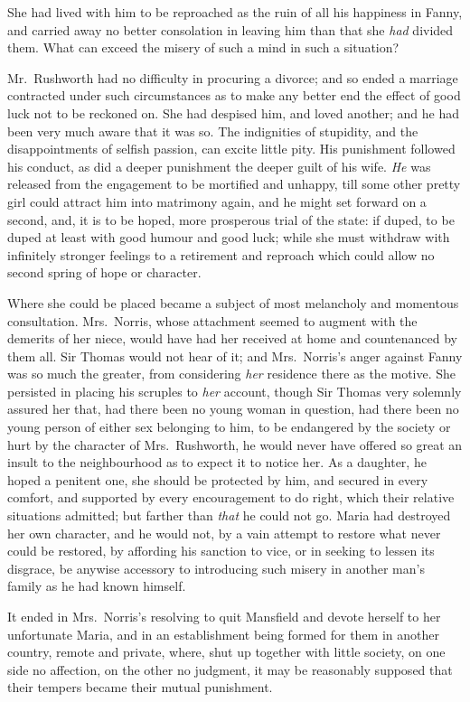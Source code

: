 \documentclass{article}
\begin{document}
She had lived with him to be reproached as the ruin
of all his happiness in Fanny, and carried away no better
consolation in leaving him than that she \emph{had} divided them.
What can exceed the misery of such a mind in such a situation?

Mr.\ Rushworth had no difficulty in procuring a divorce;
and so ended a marriage contracted under such circumstances
as to make any better end the effect of good luck not to
be reckoned on.  She had despised him, and loved another;
and he had been very much aware that it was so.
The indignities of stupidity, and the disappointments
of selfish passion, can excite little pity.  His punishment
followed his conduct, as did a deeper punishment the
deeper guilt of his wife.  \emph{He} was released from the
engagement to be mortified and unhappy, till some other
pretty girl could attract him into matrimony again,
and he might set forward on a second, and, it is to
be hoped, more prosperous trial of the state:  if duped,
to be duped at least with good humour and good luck;
while she must withdraw with infinitely stronger feelings
to a retirement and reproach which could allow no second
spring of hope or character.

Where she could be placed became a subject of most
melancholy and momentous consultation.  Mrs.\ Norris,
whose attachment seemed to augment with the demerits
of her niece, would have had her received at home and
countenanced by them all.  Sir Thomas would not hear of it;
and Mrs.\ Norris's anger against Fanny was so much the greater,
from considering \emph{her} residence there as the motive.
She persisted in placing his scruples to \emph{her} account,
though Sir Thomas very solemnly assured her that,
had there been no young woman in question, had there
been no young person of either sex belonging to him,
to be endangered by the society or hurt by the character
of Mrs.\ Rushworth, he would never have offered so great an
insult to the neighbourhood as to expect it to notice her.
As a daughter, he hoped a penitent one, she should be
protected by him, and secured in every comfort, and supported
by every encouragement to do right, which their relative
situations admitted; but farther than \emph{that} he could not go.
Maria had destroyed her own character, and he would not,
by a vain attempt to restore what never could be restored,
by affording his sanction to vice, or in seeking to lessen
its disgrace, be anywise accessory to introducing such
misery in another man's family as he had known himself.

It ended in Mrs.\ Norris's resolving to quit Mansfield
and devote herself to her unfortunate Maria, and in an
establishment being formed for them in another country,
remote and private, where, shut up together with little society,
on one side no affection, on the other no judgment,
it may be reasonably supposed that their tempers became
their mutual punishment.
\end{document}
